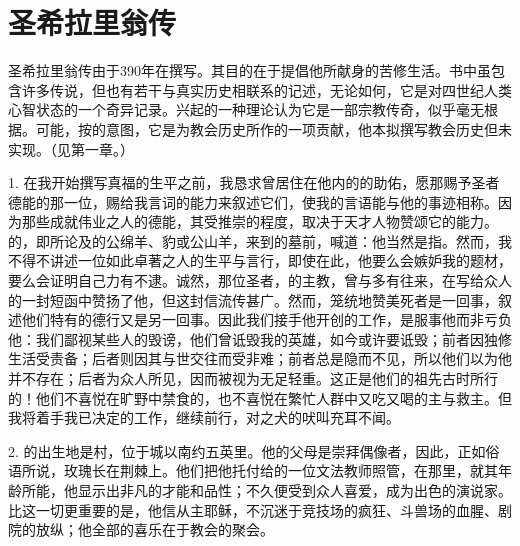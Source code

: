 
\chapter{圣希拉里翁传}


圣希拉里翁传由于390年在撰写。其目的在于提倡他所献身的苦修生活。书中虽包含许多传说，但也有若干与真实历史相联系的记述，无论如何，它是对四世纪人类心智状态的一个奇异记录。兴起的一种理论认为它是一部宗教传奇，似乎毫无根据。可能，按的意图，它是为教会历史所作的一项贡献，他本拟撰写教会历史但未实现。（见第一章。）\par

1. 在我开始撰写真福的生平之前，我恳求曾居住在他内的的助佑，愿那赐予圣者德能的那一位，赐给我言词的能力来叙述它们，使我的言语能与他的事迹相称。因为那些成就伟业之人的德能，其受推崇的程度，取决于天才人物赞颂它的能力。的，即所论及的公绵羊、豹或公山羊，来到的墓前，喊道：他当然是指。然而，我不得不讲述一位如此卓著之人的生平与言行，即使在此，他要么会嫉妒我的题材，要么会证明自己力有不逮。诚然，那位圣者，的主教，曾与多有往来，在写给众人的一封短函中赞扬了他，但这封信流传甚广。然而，笼统地赞美死者是一回事，叙述他们特有的德行又是另一回事。因此我们接手他开创的工作，是服事他而非亏负他：我们鄙视某些人的毁谤，他们曾诋毁我的英雄，如今或许要诋毁；前者因独修生活受责备；后者则因其与世交往而受非难；前者总是隐而不见，所以他们以为他并不存在；后者为众人所见，因而被视为无足轻重。这正是他们的祖先古时所行的！他们不喜悦在旷野中禁食的，也不喜悦在繁忙人群中又吃又喝的主与救主。但我将着手我已决定的工作，继续前行，对之犬的吠叫充耳不闻。\par

2. 的出生地是村，位于城以南约五英里。他的父母是崇拜偶像者，因此，正如俗语所说，玫瑰长在荆棘上。他们把他托付给的一位文法教师照管，在那里，就其年龄所能，他显示出非凡的才能和品性；不久便受到众人喜爱，成为出色的演说家。比这一切更重要的是，他信从主耶稣，不沉迷于竞技场的疯狂、斗兽场的血腥、剧院的放纵；他全部的喜乐在于教会的聚会。\par

